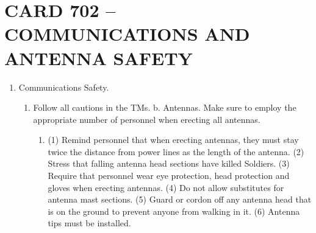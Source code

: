 \documentclass{article}
\begin{document}
\newpage
\section*{CARD 702 – COMMUNICATIONS AND ANTENNA SAFETY}
\begin{enumerate}
    \item   Communications Safety.
    \begin{enumerate}
        \item Follow all cautions in the TMs.
	b.	Antennas. Make sure to employ the appropriate number of personnel when erecting all antennas. 
	\begin{enumerate}
	    \item (1)	Remind personnel that when erecting antennas, they must stay twice the distance from power lines as the length of the antenna.
(2)	Stress that falling antenna head sections have killed Soldiers.
(3)	Require that personnel wear eye protection, head protection and gloves when erecting antennas.
(4)	Do not allow substitutes for antenna mast sections.
(5)	Guard or cordon off any antenna head that is on the ground to prevent anyone from walking in it.
(6)	Antenna tips must be installed.
	\end{enumerate}


\end{enumerate}
\end{enumerate}
\end{document}
